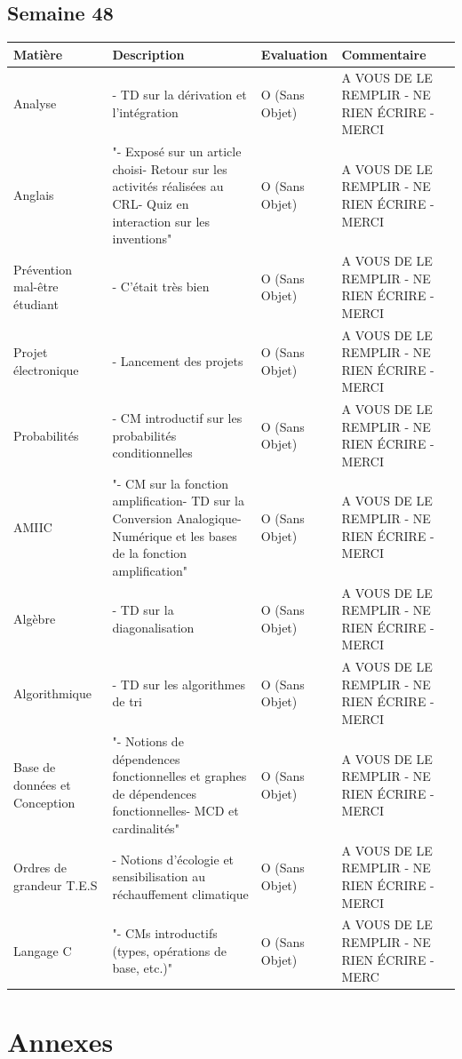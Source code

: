 \documentclass[12pt, openany]{report}
\begin{document}
\section*{Semaine 48}
\begin{tabular}{|l|l|l|l|}
\hline
Matière & Description & Evaluation & Commentaire \\ 
\hline
Analyse & - TD sur la dérivation et l'intégration & O (Sans Objet) & A VOUS DE LE REMPLIR - NE RIEN ÉCRIRE - MERCI \\ 
\hline
Anglais & "- Exposé sur un article choisi- Retour sur les activités réalisées au CRL- Quiz en interaction sur les inventions" & O (Sans Objet) & A VOUS DE LE REMPLIR - NE RIEN ÉCRIRE - MERCI \\ 
\hline
Prévention mal-être étudiant & - C'était très bien & O (Sans Objet) & A VOUS DE LE REMPLIR - NE RIEN ÉCRIRE - MERCI \\ 
\hline
Projet électronique & - Lancement des projets  & O (Sans Objet) & A VOUS DE LE REMPLIR - NE RIEN ÉCRIRE - MERCI \\ 
\hline
Probabilités & - CM introductif sur les probabilités conditionnelles & O (Sans Objet) & A VOUS DE LE REMPLIR - NE RIEN ÉCRIRE - MERCI \\ 
\hline
AMIIC & "- CM sur la fonction amplification- TD sur la Conversion Analogique-Numérique et les bases de la fonction amplification" & O (Sans Objet) & A VOUS DE LE REMPLIR - NE RIEN ÉCRIRE - MERCI \\ 
\hline
Algèbre & - TD sur la diagonalisation & O (Sans Objet) & A VOUS DE LE REMPLIR - NE RIEN ÉCRIRE - MERCI \\ 
\hline
Algorithmique & - TD sur les algorithmes de tri & O (Sans Objet) & A VOUS DE LE REMPLIR - NE RIEN ÉCRIRE - MERCI \\ 
\hline
Base de données et Conception & "- Notions de dépendences fonctionnelles et graphes de dépendences fonctionnelles- MCD et cardinalités" & O (Sans Objet) & A VOUS DE LE REMPLIR - NE RIEN ÉCRIRE - MERCI \\ 
\hline
Ordres de grandeur T.E.S & - Notions d'écologie et sensibilisation au réchauffement climatique & O (Sans Objet) & A VOUS DE LE REMPLIR - NE RIEN ÉCRIRE - MERCI \\ 
\hline
Langage C & "- CMs introductifs (types, opérations de base, etc.)" & O (Sans Objet) & A VOUS DE LE REMPLIR - NE RIEN ÉCRIRE - MERC \\ 
\hline
\end{tabular}

\chapter{Annexes}


\end{document}
